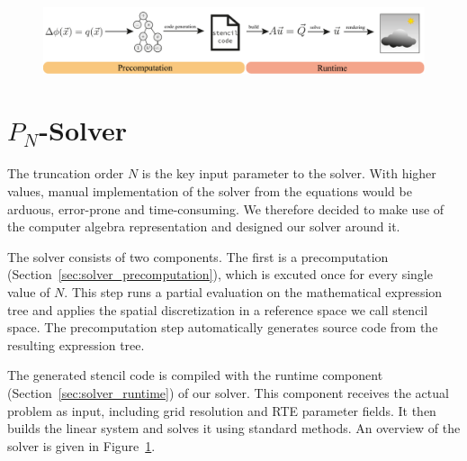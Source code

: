 \begin{figure}[t!]
\centering
\includegraphics[width=\textwidth]{figures/fig_pipeline_small.pdf}
\vspace{-0.2in}
\label{fig:pnsolver}
\end{figure}

\vspace{-0.75in}

\section{$P_N$-Solver}
\label{sec:pnsolver}

The truncation order $N$ is the key input parameter to the solver. With higher values, manual implementation of the solver from the equations would be arduous, error-prone and time-consuming. We therefore decided to make use of the computer algebra representation and designed our solver around it.

The solver consists of two components. The first is a precomputation (Section~\ref{sec:solver_precomputation}), which is excuted once for every single value of $N$. This step runs a partial evaluation on the mathematical expression tree and applies the spatial discretization in a reference space we call stencil space. The precomputation step automatically generates source code from the resulting expression tree.

The generated stencil code is compiled with the runtime component (Section~\ref{sec:solver_runtime}) of our solver. This component receives the actual problem as input, including grid resolution and RTE parameter fields. It then builds the linear system and solves it using standard methods. An overview of the solver is given in Figure~\ref{fig:pnsolver}.



